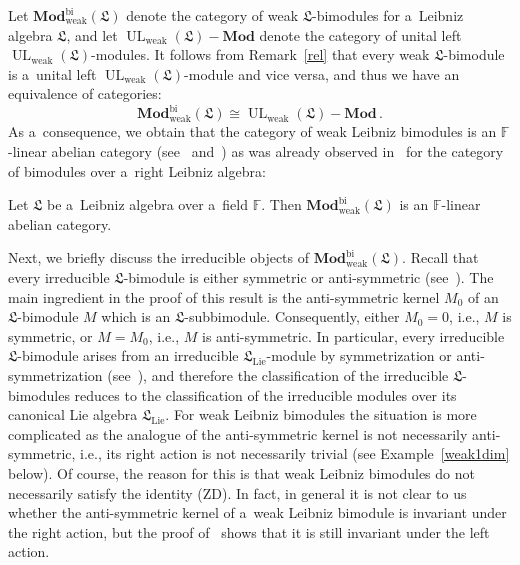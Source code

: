 \documentclass{jonasart}
\DeclareMathOperator{\bi}{bi}
\DeclareMathOperator{\lie}{Lie}
\DeclareMathOperator{\UL}{UL}
\DeclareMathOperator{\weak}{weak}
\newcommand{\fbb}{\mathbb{F}}
\newcommand{\lf}{\mathfrak{L}}
\newcommand{\Mod}{\mathbf{Mod}}
\begin{document}
	Let $\Mod_{\weak}^{\bi}(\lf)$ denote the category of weak $\lf$-bimodules for a~Leibniz algebra $\lf$, and let $\UL_{\weak}(\lf)-\Mod$
	denote the category of unital left $\UL_{\weak}(\lf)$-modules. It follows from Remark~\ref{rel} that every weak $\lf$-bimodule is a~unital left
	$\UL_{\weak}(\lf)$-module and vice versa, and thus we have an equivalence of categories:
	\[
		\Mod_{\weak}^{\bi}(\lf)\cong\UL_{\weak}(\lf)-\Mod\,.
	\]
	As a~consequence, we obtain that the category of weak Leibniz bimodules is an $\fbb$-linear abelian category (see~\cite[Chapter
	VIII]{McL} and~\cite[Definition 1.2.2]{EGNO}) as was already observed in~\cite[Section 5]{L} for the category of bimodules over a~right Leibniz algebra:
	\begin{proposition}\label{ab}
		Let $\lf$ be a~Leibniz algebra over a~field $\fbb$. Then
		$\Mod_{\weak}^{\bi}(\lf)$ is an $\fbb$-linear abelian category.
	\end{proposition}
	Next, we briefly discuss the irreducible objects of $\Mod_{\weak}^{\bi}
	(\lf)$. Recall that every irreducible $\lf$-bimodule is either symmetric or anti-sym\-metric (see~\cite[Theorem~3.14]{F1}). The main ingredient in the proof of this result is the anti-symmetric kernel $M_0$ of an
	$\lf$-bimodule $M$ which is an $\lf$-subbimodule. Consequently, either $M_0 =0$, i.e., $M$ is symmetric, or $M=M_0$, i.e., $M$ is anti-symmetric. In particular, every irreducible $\lf$-bimodule arises from an irreducible $\lf_{\lie}$-module by symmetrization or anti-symmetrization
	(see~\cite[Proposition 3.15]{F1}), and therefore the classification of the irreducible $\lf$-bimodules reduces to the classification of the irreducible modules over its canonical Lie algebra $\lf_{\lie}$. For weak
	Leibniz bimodules the situation is more complicated as the analogue of the anti-symmetric kernel is not necessarily anti-symmetric, i.e., its right action is not necessarily trivial (see Example~\ref{weak1dim}
	below). Of course, the reason for this is that weak Leibniz bimodules do not necessarily satisfy the identity (ZD). In fact, in general it is not clear to us whether the anti-symmetric kernel of a~weak Leibniz bimodule is invariant under the right action, but the proof of~\cite[Proposition~3.12]{F1}
	shows that it is still invariant under the left action.
\end{document}
